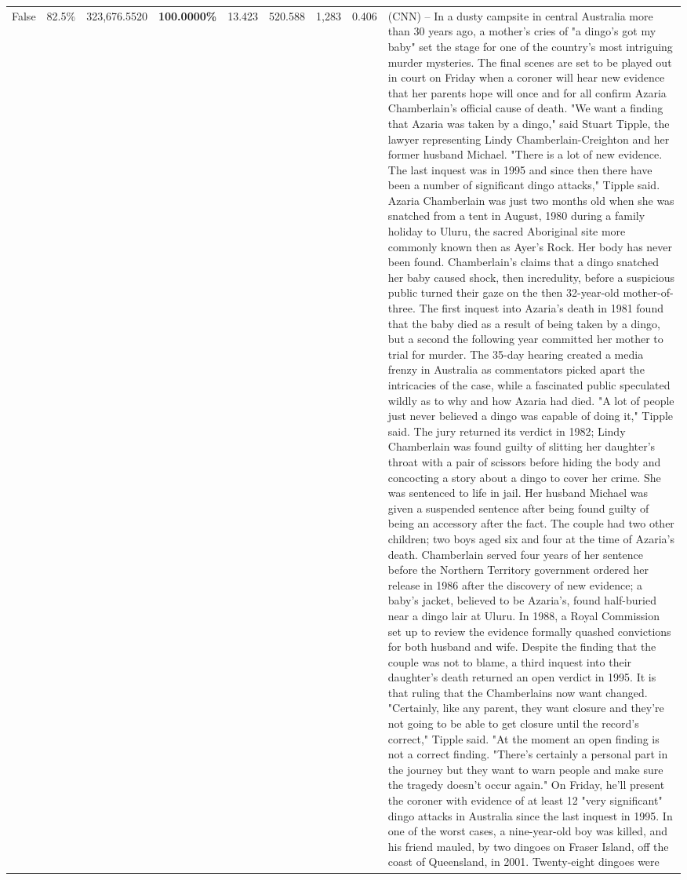 \begin{table}[H]
\begin{tabular}{lllrlllll}
False & 82.5\% & 323,676.5520 & \bfseries \color{red} 100.0000\% & 13.423 & 520.588 & 1,283 & 0.406 & (CNN) -- In a dusty campsite in central Australia more than 30 years ago, a mother's cries of "a dingo's got my baby" set the stage for one of the country's most intriguing murder mysteries. The final scenes are set to be played out in court on Friday when a coroner will hear new evidence that her parents hope will once and for all confirm Azaria Chamberlain's official cause of death. "We want a finding that Azaria was taken by a dingo," said Stuart Tipple, the lawyer representing Lindy Chamberlain-Creighton and her former husband Michael. "There is a lot of new evidence. The last inquest was in 1995 and since then there have been a number of significant dingo attacks," Tipple said. Azaria Chamberlain was just two months old when she was snatched from a tent in August, 1980 during a family holiday to Uluru, the sacred Aboriginal site more commonly known then as Ayer's Rock. Her body has never been found. Chamberlain's claims that a dingo snatched her baby caused shock, then incredulity, before a suspicious public turned their gaze on the then 32-year-old mother-of-three. The first inquest into Azaria's death in 1981 found that the baby died as a result of being taken by a dingo, but a second the following year committed her mother to trial for murder. The 35-day hearing created a media frenzy in Australia as commentators picked apart the intricacies of the case, while a fascinated public speculated wildly as to why and how Azaria had died. "A lot of people just never believed a dingo was capable of doing it," Tipple said. The jury returned its verdict in 1982; Lindy Chamberlain was found guilty of slitting her daughter's throat with a pair of scissors before hiding the body and concocting a story about a dingo to cover her crime. She was sentenced to life in jail. Her husband Michael was given a suspended sentence after being found guilty of being an accessory after the fact. The couple had two other children; two boys aged six and four at the time of Azaria's death. Chamberlain served four years of her sentence before the Northern Territory government ordered her release in 1986 after the discovery of new evidence; a baby's jacket, believed to be Azaria's, found half-buried near a dingo lair at Uluru. In 1988, a Royal Commission set up to review the evidence formally quashed convictions for both husband and wife. Despite the finding that the couple was not to blame, a third inquest into their daughter's death returned an open verdict in 1995. It is that ruling that the Chamberlains now want changed. "Certainly, like any parent, they want closure and they're not going to be able to get closure until the record's correct," Tipple said. "At the moment an open finding is not a correct finding. "There's certainly a personal part in the journey but they want to warn people and make sure the tragedy doesn't occur again." On Friday, he'll present the coroner with evidence of at least 12 "very significant" dingo attacks in Australia since the last inquest in 1995. In one of the worst cases, a nine-year-old boy was killed, and his friend mauled, by two dingoes on Fraser Island, off the coast of Queensland, in 2001. Twenty-eight dingoes were 
\end{tabular}
\end{table}
